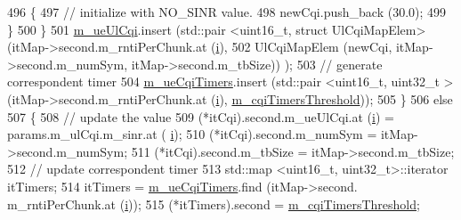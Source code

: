 \begin{DoxyCode}
496                                                 \{
497                                                         \textcolor{comment}{// initialize with NO\_SINR value.}
498                                                         newCqi.push\_back (30.0);
499                                                 \}
500                                         \}
501                                         \hyperlink{classns3_1_1MmWaveFlexTtiPfMacScheduler_a16923ad9de133d3dc54aa5cd0e524b31}{m\_ueUlCqi}.insert (std::pair <uint16\_t, struct
       UlCqiMapElem> (itMap->second.m\_rntiPerChunk.at (\hyperlink{bernuolliDistribution_8m_a6f6ccfcf58b31cb6412107d9d5281426}{i}),
502                                                                                                      
      UlCqiMapElem (newCqi, itMap->second.m\_numSym, itMap->second.m\_tbSize)) );
503                                         \textcolor{comment}{// generate correspondent timer}
504                                         \hyperlink{classns3_1_1MmWaveFlexTtiPfMacScheduler_a298ebdb8e99005d1d765e317e8a9cf8d}{m\_ueCqiTimers}.insert (std::pair <uint16\_t, uint32\_t > 
      (itMap->second.m\_rntiPerChunk.at (\hyperlink{bernuolliDistribution_8m_a6f6ccfcf58b31cb6412107d9d5281426}{i}), \hyperlink{classns3_1_1MmWaveFlexTtiPfMacScheduler_ad61563379565ec249cdf6b4092fef22e}{m\_cqiTimersThreshold}));
505                                 \}
506                                 \textcolor{keywordflow}{else}
507                                 \{
508                                         \textcolor{comment}{// update the value}
509                                         (*itCqi).second.m\_ueUlCqi.at (\hyperlink{bernuolliDistribution_8m_a6f6ccfcf58b31cb6412107d9d5281426}{i}) = params.m\_ulCqi.m\_sinr.at (
      \hyperlink{bernuolliDistribution_8m_a6f6ccfcf58b31cb6412107d9d5281426}{i});
510                                         (*itCqi).second.m\_numSym = itMap->second.m\_numSym;
511                                         (*itCqi).second.m\_tbSize = itMap->second.m\_tbSize;
512                                         \textcolor{comment}{// update correspondent timer}
513                                         std::map <uint16\_t, uint32\_t>::iterator itTimers;
514                                         itTimers = \hyperlink{classns3_1_1MmWaveFlexTtiPfMacScheduler_a298ebdb8e99005d1d765e317e8a9cf8d}{m\_ueCqiTimers}.find (itMap->second.
      m\_rntiPerChunk.at (\hyperlink{bernuolliDistribution_8m_a6f6ccfcf58b31cb6412107d9d5281426}{i}));
515                                         (*itTimers).second = 
      \hyperlink{classns3_1_1MmWaveFlexTtiPfMacScheduler_ad61563379565ec249cdf6b4092fef22e}{m\_cqiTimersThreshold};

\end{DoxyCode}
